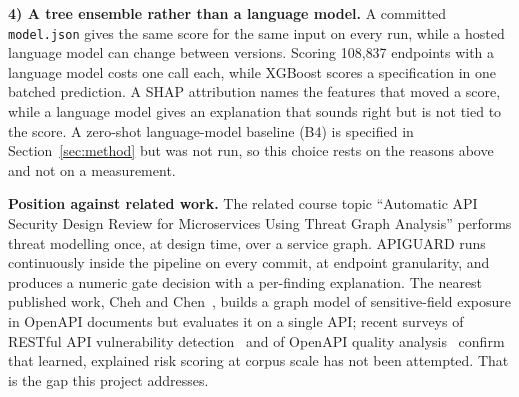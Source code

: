 \documentclass[conference]{IEEEtran}
\begin{document}
\textbf{4) A tree ensemble rather than a language model.} A committed \texttt{model.json}
gives the same score for the same input on every run, while a hosted language model can change
between versions. Scoring 108{,}837 endpoints with a language model costs one call each, while
XGBoost scores a specification in one batched prediction. A SHAP attribution names the features
that moved a score, while a language model gives an explanation that sounds right but is not
tied to the score. A zero-shot language-model baseline (B4) is specified in Section~\ref{sec:method} but was not run, so this choice rests on the reasons above and not on a measurement.

\textbf{Position against related work.} The related course topic ``Automatic API Security
Design Review for Microservices Using Threat Graph Analysis'' performs threat modelling once,
at design time, over a service graph. APIGUARD runs continuously inside the pipeline on every
commit, at endpoint granularity, and produces a numeric gate decision with a per-finding
explanation. The nearest published work, Cheh and Chen~\cite{cheh}, builds a graph model of
sensitive-field exposure in OpenAPI documents but evaluates it on a single API; recent surveys
of RESTful API vulnerability detection~\cite{tanveer} and of OpenAPI quality
analysis~\cite{oasquali} confirm that learned, explained risk scoring at corpus scale has not
been attempted. That is the gap this project addresses.
\end{document}
